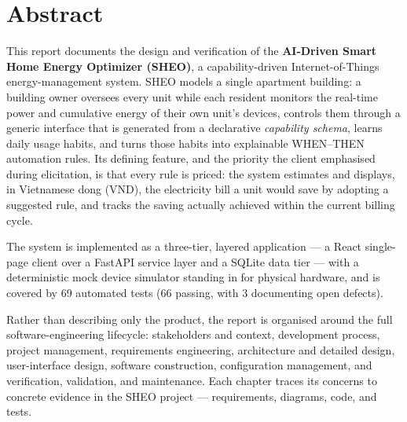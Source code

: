 \chapter*{Abstract}

This report documents the design and verification of the \textbf{AI-Driven Smart Home Energy
Optimizer (SHEO)}, a capability-driven Internet-of-Things energy-management system.
SHEO models a
single apartment building: a building owner oversees every unit while each resident
monitors the real-time power and cumulative energy of their own unit's devices, controls them
through a generic interface that is generated from a declarative \emph{capability schema},
learns daily usage habits, and turns those habits into explainable \mbox{WHEN--THEN}
automation rules. Its defining feature, and the priority the client emphasised during
elicitation, is that every rule is priced: the system estimates and displays, in
Vietnamese dong (VND), the electricity bill a unit would save by adopting a suggested
rule, and tracks the saving actually achieved within the current billing cycle.

The system is implemented as a three-tier, layered application --- a React single-page
client over a FastAPI service layer and a SQLite data tier --- with a deterministic mock
device simulator standing in for physical hardware, and is covered by 69 automated tests
(66 passing, with 3 documenting open defects).

Rather than describing only the product, the report is organised around the full
software-engineering lifecycle: stakeholders and context, development process, project
management, requirements engineering, architecture and detailed design, user-interface
design, software construction, configuration management, and verification, validation,
and maintenance. Each chapter traces its concerns to concrete evidence in the SHEO
project --- requirements, diagrams, code, and tests.
